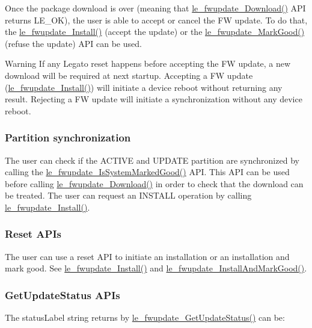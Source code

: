 Once the package download is over (meaning that \hyperlink{le__fwupdate__interface_8h_ab68f3a7c5d4284306468e888bf6a8796}{le\+\_\+fwupdate\+\_\+\+Download()} A\+PI returns L\+E\+\_\+\+OK), the user is able to accept or cancel the FW update. To do that, the \hyperlink{le__fwupdate__interface_8h_a534e72fc1a6c20a36a9bdf4a58074159}{le\+\_\+fwupdate\+\_\+\+Install()} (accept the update) or the \hyperlink{le__fwupdate__interface_8h_ad153c293ff605e7aef51929c873e2792}{le\+\_\+fwupdate\+\_\+\+Mark\+Good()} (refuse the update) A\+PI can be used. \begin{DoxyWarning}{Warning}
If any Legato reset happens before accepting the FW update, a new download will be required at next startup. Accepting a FW update (\hyperlink{le__fwupdate__interface_8h_a534e72fc1a6c20a36a9bdf4a58074159}{le\+\_\+fwupdate\+\_\+\+Install()}) will initiate a device reboot without returning any result. Rejecting a FW update will initiate a synchronization without any device reboot.
\end{DoxyWarning}
\hypertarget{platformConstraintsDualSys_fwupdateConstrain_PartitionSync}{}\subsubsection{Partition synchronization}\label{platformConstraintsDualSys_fwupdateConstrain_PartitionSync}
The user can check if the A\+C\+T\+I\+VE and U\+P\+D\+A\+TE partition are synchronized by calling the \hyperlink{le__fwupdate__interface_8h_aafc80ed054d69c6d159933093bb13ff7}{le\+\_\+fwupdate\+\_\+\+Is\+System\+Marked\+Good()} A\+PI. This A\+PI can be used before calling \hyperlink{le__fwupdate__interface_8h_ab68f3a7c5d4284306468e888bf6a8796}{le\+\_\+fwupdate\+\_\+\+Download()} in order to check that the download can be treated. The user can request an I\+N\+S\+T\+A\+LL operation by calling \hyperlink{le__fwupdate__interface_8h_a534e72fc1a6c20a36a9bdf4a58074159}{le\+\_\+fwupdate\+\_\+\+Install()}.\hypertarget{platformConstraintsDualSys_fwupdateConstrain_Reset}{}\subsubsection{Reset A\+P\+Is}\label{platformConstraintsDualSys_fwupdateConstrain_Reset}
The user can use a reset A\+PI to initiate an installation or an installation and mark good. See \hyperlink{le__fwupdate__interface_8h_a534e72fc1a6c20a36a9bdf4a58074159}{le\+\_\+fwupdate\+\_\+\+Install()} and \hyperlink{le__fwupdate__interface_8h_a9e8d0d482a2a4f207650cc01296811be}{le\+\_\+fwupdate\+\_\+\+Install\+And\+Mark\+Good()}.\hypertarget{platformConstraintsDualSys_fwupdateConstrain_GetUpdateStatus}{}\subsubsection{Get\+Update\+Status A\+P\+Is}\label{platformConstraintsDualSys_fwupdateConstrain_GetUpdateStatus}
The status\+Label string returns by \hyperlink{le__fwupdate__interface_8h_abb967dcbee7f8d2ae75d708bec5e4fc9}{le\+\_\+fwupdate\+\_\+\+Get\+Update\+Status()} can be\+:


